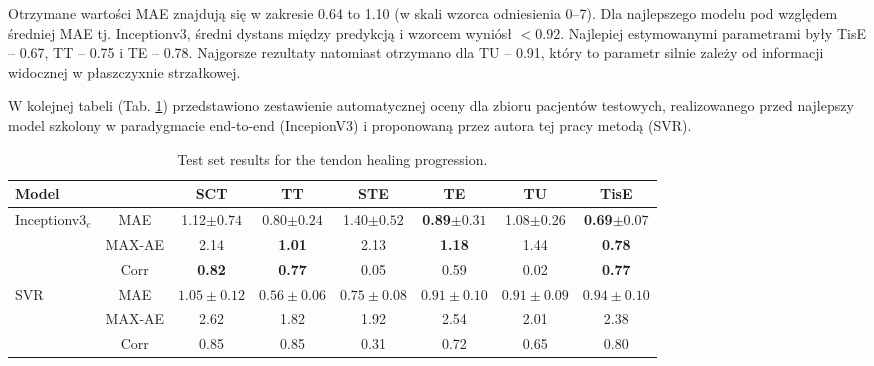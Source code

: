 Otrzymane wartości MAE znajdują się w zakresie 0.64 to 1.10 (w skali wzorca odniesienia 0--7). Dla najlepszego modelu pod względem średniej MAE tj. Inceptionv3, średni dystans między predykcją i wzorcem wyniósł $<0.92$. Najlepiej estymowanymi parametrami były TisE -- 0.67, TT -- 0.75 i TE -- 0.78. Najgorsze rezultaty natomiast otrzymano dla TU -- 0.91, który to parametr silnie zależy od informacji widocznej w płaszczyxnie strzałkowej.

W kolejnej tabeli (Tab. \ref{tab:end-to-end_testset}) przedstawiono zestawienie automatycznej oceny dla zbioru pacjentów testowych, realizowanego przed najlepszy model szkolony w paradygmacie end-to-end (IncepionV3) i proponowaną przez autora tej pracy metodą (SVR).  

\begin{table}[t]
	\caption{Test set results for the tendon healing progression.}
	\scriptsize
	\begin{center}
		\begin{tabular}{lc||c|c|c|c|c|c}
			\textbf{Model} & & \textbf{SCT} & \textbf{TT} & \textbf{STE} & \textbf{TE} & \textbf{TU} & \textbf{TisE}\\ 
			
\hline
			Inceptionv3$_{e}$ & MAE & 1.12$\pm{0.74}$ & 0.80$\pm{0.24}$ & 1.40$\pm{0.52}$ & \textbf{0.89}$\pm{0.31}$ & 1.08$\pm{0.26}$ & \textbf{0.69}$\pm{0.07}$ \\
			& MAX-AE & 2.14 & \textbf{1.01} & 2.13 & \textbf{1.18} & 1.44 & \textbf{0.78} \\
			& Corr & \textbf{0.82} & \textbf{0.77} & 0.05 & 0.59 & 0.02 & \textbf{0.77} \\ \hline
			SVR & MAE & $1.05\pm0.12$ & $0.56\pm0.06$ & $0.75\pm0.08$ & $0.91\pm0.10$ & $0.91\pm0.09$ & $0.94\pm0.10$\\
			& MAX-AE & 2.62 & 1.82 & 1.92 & 2.54 & 2.01 & 2.38 \\
			& Corr   & 0.85 & 0.85 & 0.31 & 0.72 & 0.65 & 0.80 
		\end{tabular}
	\end{center}
	\label{tab:end-to-end_testset}
\end{table}

